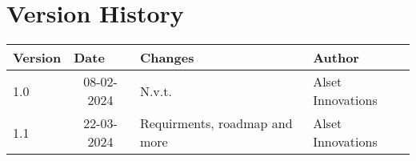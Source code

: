 \section*{Version History} 

\begin{table}[h]
\begin{tabular}{|l|l|l|l|}
\hline
\rowcolor[HTML]{4472C4} 
{\color[HTML]{FFFFFF} \textbf{Version}} &
  {\color[HTML]{FFFFFF} \textbf{Date}} &
  {\color[HTML]{FFFFFF} \textbf{Changes}} &
  {\color[HTML]{FFFFFF} \textbf{Author}} \\ \hline
\rowcolor[HTML]{D9E1F2} 1.0 & \multicolumn{1}{c|}{\cellcolor[HTML]{D9E1F2}08-02-2024} & N.v.t. & Alset Innovations \\
\rowcolor[HTML]{D9E1F2} 1.1 & \multicolumn{1}{c|}{\cellcolor[HTML]{D9E1F2}22-03-2024} & Requirments, roadmap and more & Alset Innovations \\ \hline



\end{tabular}
\end{table}